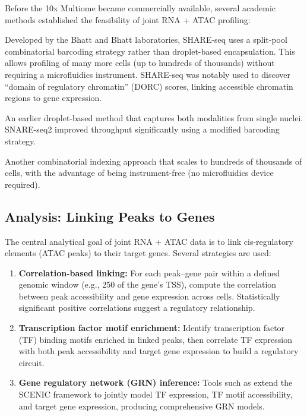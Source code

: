 Before the 10x Multiome became commercially available, several academic methods established the feasibility of joint RNA + ATAC profiling:

\begin{description}[style=nextline, itemsep=3pt]
  \item[SHARE-seq (Simultaneous High-throughput ATAC and RNA Expression with Sequencing)] Developed by the Bhatt and Bhatt laboratories, SHARE-seq uses a split-pool combinatorial barcoding strategy rather than droplet-based encapsulation. This allows profiling of many more cells (up to hundreds of thousands) without requiring a microfluidics instrument. SHARE-seq was notably used to discover ``domain of regulatory chromatin'' (DORC) scores, linking accessible chromatin regions to gene expression.

  \item[SNARE-seq (Single-Nucleus Chromatin Accessibility and mRNA Expression Sequencing)] An earlier droplet-based method that captures both modalities from single nuclei. SNARE-seq2 improved throughput significantly using a modified barcoding strategy.

  \item[Paired-seq] Another combinatorial indexing approach that scales to hundreds of thousands of cells, with the advantage of being instrument-free (no microfluidics device required).
\end{description}

\subsection{Analysis: Linking Peaks to Genes}
\label{subsec:multiomics:peak-gene-linking}

The central analytical goal of joint RNA + ATAC data is to link cis-regulatory elements (ATAC peaks) to their target genes. Several strategies are used:

\begin{enumerate}[itemsep=3pt]
  \item \textbf{Correlation-based linking:} For each peak--gene pair within a defined genomic window (e.g., 250\kilobase{} of the gene's TSS), compute the correlation between peak accessibility and gene expression across cells. Statistically significant positive correlations suggest a regulatory relationship.
  \item \textbf{Transcription factor motif enrichment:} Identify transcription factor (TF) binding motifs enriched in linked peaks, then correlate TF expression with both peak accessibility and target gene expression to build a regulatory circuit.
  \item \textbf{Gene regulatory network (GRN) inference:} Tools such as  extend the SCENIC framework to jointly model TF expression, TF motif accessibility, and target gene expression, producing comprehensive GRN models.
\end{enumerate}

